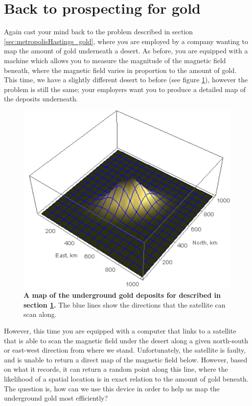 \documentclass[11pt,fullpage]{book}
\begin{document}
\section{Back to prospecting for gold}\label{sec:Gibbs_gold}
Again cast your mind back to the problem described in section \ref{sec:metropolisHastings_gold}, where you are employed by a company wanting to map the amount of gold underneath a desert. As before, you are equipped with a machine which allows you to measure the magnitude of the magnetic field beneath, where the magnetic field varies in proportion to the amount of gold. This time, we have a slightly different desert to before (see figure \ref{fig:Gibbs_goldMiningAgain1}), however the problem is still the same; your employers want you to produce a detailed map of the deposits underneath. 

\begin{figure}
\centerline{\includegraphics[width=1\textwidth]{Gibbs_goldMiningAgain1.png}}
\caption{\textbf{A map of the underground gold deposits for described in section \ref{sec:Gibbs_gold}.} The blue lines show the directions that the satellite can scan along.}\label{fig:Gibbs_goldMiningAgain1}
\end{figure}

However, this time you are equipped with a computer that links to a satellite that is able to scan the magnetic field under the desert along a given north-south or east-west direction from where we stand. Unfortunately, the satellite is faulty, and is unable to return a direct map of the magnetic field below. However, based on what it records, it can return a random point along this line, where the likelihood of a spatial location is in exact relation to the amount of gold beneath. The question is, how can we use this device in order to help us map the underground gold most efficiently?
\end{document}
